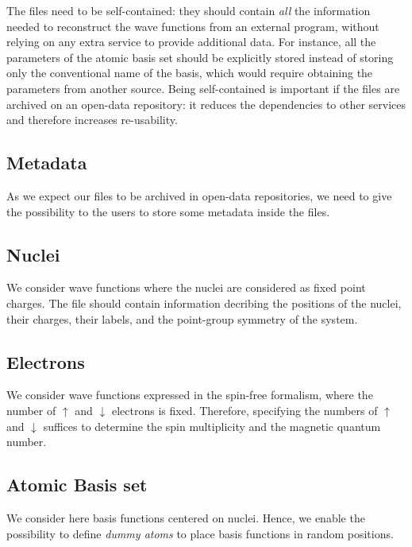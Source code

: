 The files need to be self-contained: they should contain
\emph{all} the information needed to reconstruct the wave functions
from an external program, without relying on any extra service to
provide additional data.
For instance, all the parameters of the atomic basis set should be
explicitly stored instead of storing only the conventional name of the
basis, which would require obtaining the parameters from another
source. Being self-contained is important if the files are archived
on an open-data repository: it reduces the dependencies to other
services and therefore increases re-usability.

\subsection{Metadata}

As we expect our files to be archived in open-data repositories, we
need to give the possibility to the users to store some metadata
inside the files.

\subsection{Nuclei}

We consider wave functions where the nuclei are considered as fixed
point charges. The file should contain information decribing the
positions of the nuclei, their charges, their labels, and the
point-group symmetry of the system.

\subsection{Electrons}

We consider wave functions expressed in the spin-free formalism, where
the number of $\uparrow$ and $\downarrow$ electrons is
fixed. Therefore, specifying the numbers of $\uparrow$ and
$\downarrow$ suffices to determine the spin multiplicity and the
magnetic quantum number.

\subsection{Atomic Basis set}

We consider here basis functions centered on nuclei. Hence, we enable
the possibility to define \emph{dummy atoms} to place basis functions
in random positions.

